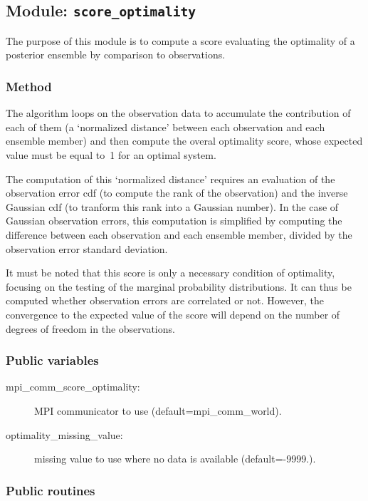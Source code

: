 \documentclass[11pt]{article}
\begin{document}
\subsection{Module: {\tt\bf score\_optimality}}

The purpose of this module is to compute a score
evaluating the optimality of a posterior ensemble
by comparison to observations.

\subsubsection*{Method}

The algorithm loops on the observation data
to accumulate the contribution of each of them
(a `normalized distance' between each observation and each ensemble member)
and then compute the overal optimality score,
whose expected value must be equal to~1 for an optimal system.

The computation of this `normalized distance' requires an evaluation
of the observation error cdf (to compute the rank of the observation)
and the inverse Gaussian cdf (to tranform this rank into a Gaussian number).
In the case of Gaussian observation errors, this computation is simplified
by computing the difference between each observation and each ensemble member,
divided by the observation error standard deviation.

It must be noted that this score is only a necessary condition of optimality,
focusing on the testing of the marginal probability distributions.
It can thus be computed whether observation errors are correlated or not.
However, the convergence to the expected value of the score
will depend on the number of degrees of freedom in the observations.

\subsubsection*{Public variables}

\begin{description}
\item[mpi\_comm\_score\_optimality:] MPI communicator to use (default=mpi\_comm\_world).
\item[optimality\_missing\_value:] missing value to use where no data is available (default=-9999.).
\end{description}

\subsubsection*{Public routines}
\end{document}
